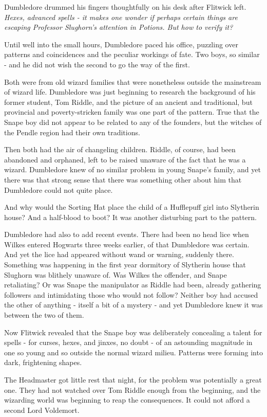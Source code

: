 \documentclass[a4paper,11pt]{article}
\begin{document}
Dumbledore drummed his fingers thoughtfully on his desk after Flitwick left. \emph{Hexes, advanced spells - it makes one wonder if perhaps certain things are escaping Professor Slughorn's attention in Potions. But how to verify it?}

Until well into the small hours, Dumbledore paced his office, puzzling over patterns and coincidences and the peculiar workings of fate. Two boys, so similar - and he did not wish the second to go the way of the first.

Both were from old wizard families that were nonetheless outside the mainstream of wizard life. Dumbledore was just beginning to research the background of his former student, Tom Riddle, and the picture of an ancient and traditional, but provincial and poverty-stricken family was one part of the pattern. True that the Snape boy did not appear to be related to any of the founders, but the witches of the Pendle region had their own traditions.

Then both had the air of changeling children. Riddle, of course, had been abandoned and orphaned, left to be raised unaware of the fact that he was a wizard. Dumbledore knew of no similar problem in young Snape's family, and yet there was that strong sense that there was something other about him that Dumbledore could not quite place.

And why would the Sorting Hat place the child of a Hufflepuff girl into Slytherin house? And a half-blood to boot? It was another disturbing part to the pattern.

Dumbledore had also to add recent events. There had been no head lice when Wilkes entered Hogwarts three weeks earlier, of that Dumbledore was certain. And yet the lice had appeared without wand or warning, suddenly there. Something was happening in the first year dormitory of Slytherin house that Slughorn was blithely unaware of. Was Wilkes the offender, and Snape retaliating? Or was Snape the manipulator as Riddle had been, already gathering followers and intimidating those who would not follow? Neither boy had accused the other of anything - itself a bit of a mystery - and yet Dumbledore knew it was between the two of them.

Now Flitwick revealed that the Snape boy was deliberately concealing a talent for spells - for curses, hexes, and jinxes, no doubt - of an astounding magnitude in one so young and so outside the normal wizard milieu. Patterns were forming into dark, frightening shapes.

The Headmaster got little rest that night, for the problem was potentially a great one. They had not watched over Tom Riddle enough from the beginning, and the wizarding world was beginning to reap the consequences. It could not afford a second Lord Voldemort.
\end{document}
